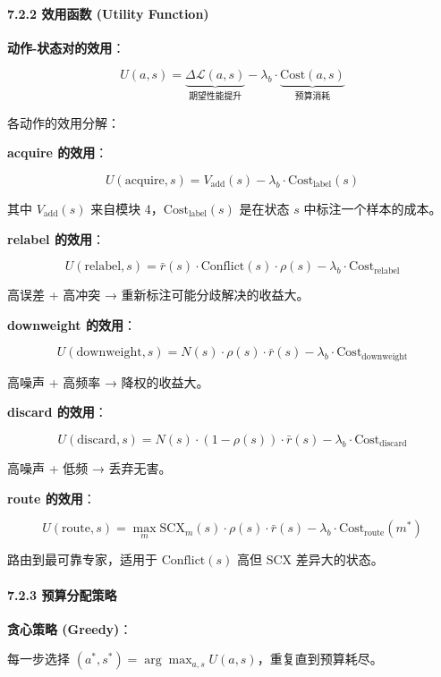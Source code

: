 \documentclass[
  12pt,
]{ctexart}
\begin{document}
\paragraph{7.2.2 效用函数 (Utility
Function)}\label{ux6548ux7528ux51fdux6570-utility-function}

\textbf{动作-状态对的效用}：

\[
U(a, s) = \underbrace{\Delta \mathcal{L}(a, s)}_{\text{期望性能提升}} - \lambda_b \cdot \underbrace{\text{Cost}(a, s)}_{\text{预算消耗}}
\]

各动作的效用分解：

\textbf{acquire 的效用}：

\[
U(\text{acquire}, s) = V_{\text{add}}(s) - \lambda_b \cdot \text{Cost}_{\text{label}}(s)
\]

其中 \(V_{\text{add}}(s)\) 来自模块 4，\(\text{Cost}_{\text{label}}(s)\)
是在状态 \(s\) 中标注一个样本的成本。

\textbf{relabel 的效用}：

\[
U(\text{relabel}, s) = \bar{r}(s) \cdot \text{Conflict}(s) \cdot \rho(s) - \lambda_b \cdot \text{Cost}_{\text{relabel}}
\]

高误差 + 高冲突 → 重新标注可能分歧解决的收益大。

\textbf{downweight 的效用}：

\[
U(\text{downweight}, s) = N(s) \cdot \rho(s) \cdot \bar{r}(s) - \lambda_b \cdot \text{Cost}_{\text{downweight}}
\]

高噪声 + 高频率 → 降权的收益大。

\textbf{discard 的效用}：

\[
U(\text{discard}, s) = N(s) \cdot (1 - \rho(s)) \cdot \bar{r}(s) - \lambda_b \cdot \text{Cost}_{\text{discard}}
\]

高噪声 + 低频 → 丢弃无害。

\textbf{route 的效用}：

\[
U(\text{route}, s) = \max_m \text{SCX}_m(s) \cdot \rho(s) \cdot \bar{r}(s) - \lambda_b \cdot \text{Cost}_{\text{route}}(m^*)
\]

路由到最可靠专家，适用于 \(\text{Conflict}(s)\) 高但 \(\text{SCX}\)
差异大的状态。

\paragraph{7.2.3
预算分配策略}\label{ux9884ux7b97ux5206ux914dux7b56ux7565}

\textbf{贪心策略 (Greedy)}：

每一步选择 \((a^*, s^*) = \arg\max_{a,s} U(a, s)\)，重复直到预算耗尽。
\end{document}

